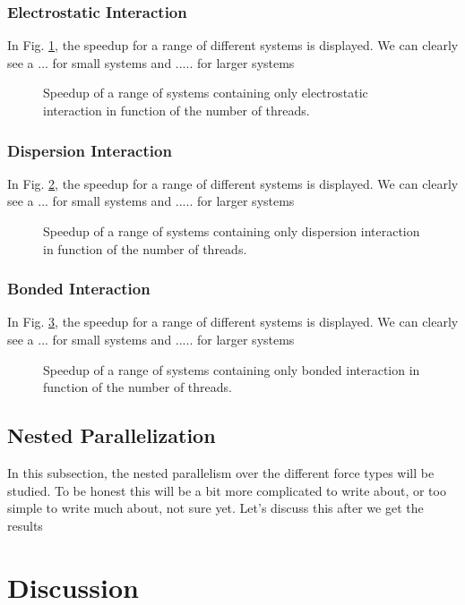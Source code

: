 \documentclass[conference]{IEEEtran}
\begin{document}
        \subsubsection{Electrostatic Interaction}
        In Fig. \ref{fig:electro-speedup}, the speedup for a range of different systems is displayed. We can clearly
        see a ... for small systems and ..... for larger systems
        \begin{figure}[H]
            \centering
            \caption{Speedup of a range of systems containing only electrostatic interaction in function of the number 
            of threads.}\label{fig:electro-speedup}
        \end{figure}


        \subsubsection{Dispersion Interaction}
        In Fig. \ref{fig:dispersion-speedup}, the speedup for a range of different systems is displayed. We can clearly
        see a ... for small systems and ..... for larger systems
        \begin{figure}[H]
            \centering
            \caption{Speedup of a range of systems containing only dispersion interaction in function of the number 
            of threads.}\label{fig:dispersion-speedup}
        \end{figure}

        \subsubsection{Bonded Interaction}
        In Fig. \ref{fig:bonded-speedup}, the speedup for a range of different systems is displayed. We can clearly
        see a ... for small systems and ..... for larger systems
        \begin{figure}[H]
            \centering
            \caption{Speedup of a range of systems containing only bonded interaction in function of the number 
            of threads.}\label{fig:bonded-speedup}
        \end{figure}
    
    \subsection{Nested Parallelization}
    In this subsection, the nested parallelism over the different force types will be studied. To be honest this will
    be a bit more complicated to write about, or too simple to write much about, not sure yet. Let's discuss this
    after we get the results

\section{Discussion}





\end{document}
